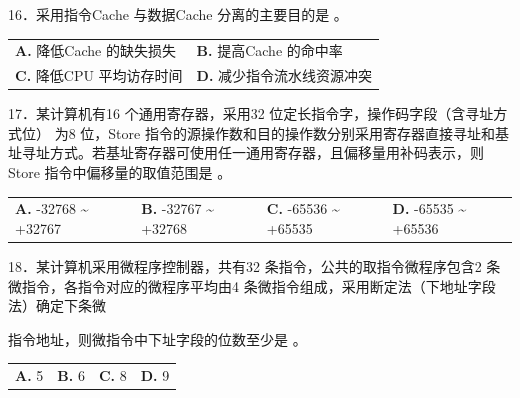 \documentclass[UTF8,11pt]{ctexart}
\begin{document}
16．采用指令Cache 与数据Cache 分离的主要目的是 。


\begin{center}\begin{tabular}{>{\raggedright\arraybackslash}p{\dimexpr(\linewidth-4\tabcolsep)/2\relax}>{\raggedright\arraybackslash}p{\dimexpr(\linewidth-4\tabcolsep)/2\relax}}
\textbf{A.} 降低Cache 的缺失损失 & \textbf{B.} 提高Cache 的命中率\\[.35em]
\textbf{C.} 降低CPU 平均访存时间 & \textbf{D.} 减少指令流水线资源冲突\\[.35em]\end{tabular}\end{center}

17．某计算机有16 个通用寄存器，采用32 位定长指令字，操作码字段（含寻址方式位） 为8 位，Store 指令的源操作数和目的操作数分别采用寄存器直接寻址和基址寻址方式。若基址寄存器可使用任一通用寄存器，且偏移量用补码表示，则Store 指令中偏移量的取值范围是 。


\begin{center}\begin{tabular}{>{\raggedright\arraybackslash}p{\dimexpr(\linewidth-8\tabcolsep)/4\relax}>{\raggedright\arraybackslash}p{\dimexpr(\linewidth-8\tabcolsep)/4\relax}>{\raggedright\arraybackslash}p{\dimexpr(\linewidth-8\tabcolsep)/4\relax}>{\raggedright\arraybackslash}p{\dimexpr(\linewidth-8\tabcolsep)/4\relax}}
\textbf{A.} -32768 \textasciitilde{} +32767 & \textbf{B.} -32767 \textasciitilde{} +32768 & \textbf{C.} -65536 \textasciitilde{} +65535 & \textbf{D.} -65535 \textasciitilde{} +65536\\[.35em]\end{tabular}\end{center}

18．某计算机采用微程序控制器，共有32 条指令，公共的取指令微程序包含2 条微指令，各指令对应的微程序平均由4 条微指令组成，采用断定法（下地址字段法）确定下条微


指令地址，则微指令中下址字段的位数至少是 。


\begin{center}\begin{tabular}{>{\raggedright\arraybackslash}p{\dimexpr(\linewidth-8\tabcolsep)/4\relax}>{\raggedright\arraybackslash}p{\dimexpr(\linewidth-8\tabcolsep)/4\relax}>{\raggedright\arraybackslash}p{\dimexpr(\linewidth-8\tabcolsep)/4\relax}>{\raggedright\arraybackslash}p{\dimexpr(\linewidth-8\tabcolsep)/4\relax}}
\textbf{A.} 5 & \textbf{B.} 6 & \textbf{C.} 8 & \textbf{D.} 9\\[.35em]\end{tabular}\end{center}
\end{document}
